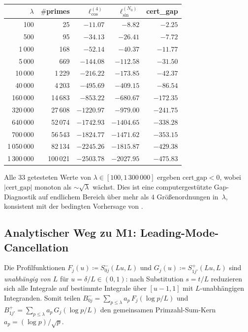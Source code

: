 ﻿\documentclass[12pt,a4paper]{article}
\theoremstyle{definition}
\theoremstyle{remark}
\begin{document}
\begin{center}
\small
\renewcommand{\arraystretch}{1.15}
\begin{tabular}{r|r|r|r|r}
$\lambda$ & $\#$primes & $\ell_{\cos}^{(4)}$ & $\ell_{\sin}^{(N_0)}$ & cert\_gap \\\hline
100   & 25     & $-11.07$ & $-8.82$   & $-2.25$ \\
500   & 95     & $-34.13$ & $-26.41$  & $-7.72$ \\
1\,000 & 168   & $-52.14$ & $-40.37$  & $-11.77$ \\
5\,000 & 669   & $-144.08$ & $-112.58$ & $-31.50$ \\
10\,000 & 1\,229 & $-216.22$ & $-173.85$ & $-42.37$ \\
40\,000 & 4\,203 & $-495.69$ & $-409.15$ & $-86.54$ \\
160\,000 & 14\,683 & $-853.22$ & $-680.67$ & $-172.35$ \\
320\,000 & 27\,608 & $-1220.97$ & $-979.00$ & $-241.75$ \\
640\,000 & 52\,074 & $-1742.93$ & $-1404.65$ & $-338.28$ \\
700\,000 & 56\,543 & $-1824.77$ & $-1471.62$ & $-353.15$ \\
1\,050\,000 & 82\,134 & $-2245.26$ & $-1815.87$ & $-429.38$ \\
1\,300\,000 & 100\,021 & $-2503.78$ & $-2027.95$ & $-475.83$
\end{tabular}
\end{center}

\noindent Alle $33$ getesteten Werte von $\lambda \in [100, 1\,300\,000]$ ergeben $\mathrm{cert\_gap} < 0$, wobei $|\mathrm{cert\_gap}|$ monoton als $\sim\!\sqrt{\lambda}$ wächst. Dies ist eine computergestützte Gap-Diagnostik auf endlichem Bereich über mehr als $4$ Größenordnungen in~$\lambda$, konsistent mit der bedingten Vorhersage von .

\subsection{Analytischer Weg zu M1: Leading-Mode-Cancellation}
\label{sec:leading-mode}

Die Profilfunktionen $F_j(u) \coloneqq S^-_{0j}(Lu, L)$ und $G_j(u) \coloneqq S^+_{1j'}(Lu, L)$ sind \emph{unabhängig von $L$} für $u = \delta/L \in (0,1)$: nach Substitution $s = t/L$ reduzieren sich alle Integrale auf bestimmte Integrale über $[u-1, 1]$ mit $L$-unabhängigen Integranden. Somit teilen $B_{0j}^- = \sum_{p \leq \lambda} a_p\, F_j(\log p/L)$ und $B_{1j'}^+ = \sum_{p \leq \lambda} a_p\, G_j(\log p/L)$ den gemeinsamen Primzahl-Sum-Kern $a_p = (\log p)/\sqrt{p}$.
\end{document}
